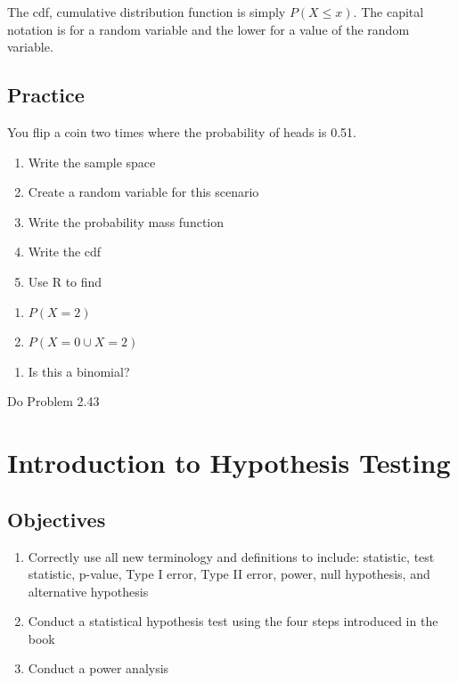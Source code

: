 \documentclass[]{book}
\providecommand{\tightlist}{%
  \setlength{\itemsep}{0pt}\setlength{\parskip}{0pt}}
\theoremstyle{definition}
\theoremstyle{definition}
\theoremstyle{definition}
\theoremstyle{remark}
\begin{document}
The cdf, cumulative distribution function is simply \(P(X \leq x)\). The
capital notation is for a random variable and the lower for a value of
the random variable.

\subsection{Practice}\label{practice}

You flip a coin two times where the probability of heads is 0.51.

\begin{enumerate}
\def\labelenumi{\arabic{enumi}.}
\tightlist
\item
  Write the sample space\\
\item
  Create a random variable for this scenario\\
\item
  Write the probability mass function
\item
  Write the cdf\\
\item
  Use R to find\\
\end{enumerate}

\begin{enumerate}
\def\labelenumi{\roman{enumi}.}
\tightlist
\item
  \(P(X=2)\)\\
\item
  \(P(X=0 \cup X=2)\)\\
\end{enumerate}

\begin{enumerate}
\def\labelenumi{\arabic{enumi}.}
\setcounter{enumi}{5}
\tightlist
\item
  Is this a binomial?
\end{enumerate}

Do Problem 2.43

\hypertarget{L8}{\section{Introduction to Hypothesis Testing}\label{L8}}

\subsection{Objectives}\label{objectives-7}

\begin{enumerate}
\def\labelenumi{\arabic{enumi}.}
\tightlist
\item
  Correctly use all new terminology and definitions to include:
  statistic, test statistic, p-value, Type I error, Type II error,
  power, null hypothesis, and alternative hypothesis\\
\item
  Conduct a statistical hypothesis test using the four steps introduced
  in the book\\
\item
  Conduct a power analysis
\end{enumerate}
\end{document}

